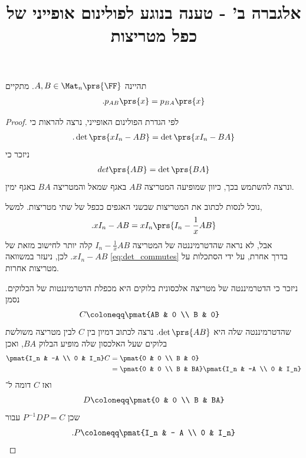 \documentclass[a4paper,10pt,twoside,openany]{article}
\title{
אלגברה ב' - טענה בנוגע לפולינום אופייני של כפל מטריצות
}
\date{}
\begin{document}
\maketitle

\begin{proposition}
תהיינה
$A,B \in \Mat_n\prs{\FF}$.
מתקיים
\begin{align*}
\text{.} p_{AB}\prs{x} = p_{BA}\prs{x}
\end{align*}
\end{proposition}

\begin{proof}
לפי הגדרת הפולינום האופייני, נרצה להראות כי
\begin{align*}
\text{.} \det\prs{x I_n - AB} = \det\prs{xI_n - BA}
\end{align*}
ניזכר כי
\begin{align}\label{eq:det_commutes}
det\prs{AB} = \det\prs{BA}
\end{align}
ונרצה להשתמש בכך, כיוון שמופיעה המטריצה
$AB$
באגף שמאל והמטריצה
$BA$
באגף ימין.

נוכל לנסות לכתוב את המטריצות שבשני האגפים ככפל של שתי מטריצות. למשל,
\begin{align*}
\text{.} x I_n - AB = x I_n \prs{I_n - \frac{1}{x} AB}
\end{align*}
אבל, לא נראה שהדטרמיננטה של המטריצה
$I_n - \frac{1}{x} AB$
קלה יותר לחישוב מזאת של
$x I_n - AB$.
לכן, ניעזר במשוואה
\eqref{eq:det_commutes}
בדרך אחרת, על ידי הסתכלות על מטריצות אחרות.

ניזכר כי הדטרמיננטה של מטריצה אלכסונית בלוקים היא מכפלת הדטרמיננטות של הבלוקים. נסמן
\begin{align*}
C &\coloneqq \pmat{AB & 0 \\ B & 0}
\end{align*}
שהדטרמיננטה שלה היא
$\det\prs{AB}$.
נרצה לכתוב דמיון בין
$C$
לבין מטריצה משולשת בלוקים שעל האלכסון שלה מופיע הבלוק
$BA$,
ואכן
\begin{align*}
\pmat{I_n & -A \\ 0 & I_n} C &= \pmat{0 & 0 \\ B & 0}
\\&= \pmat{0 & 0 \\ B & BA} \pmat{I_n & -A \\ 0 & I_n}
\end{align*}
ואז
$C$
דומה ל־%
\begin{align*}
D \coloneqq \pmat{0 & 0 \\ B & BA}
\end{align*}
שכן
$P^{-1} D P = C$
עבור
\[\text{.} P \coloneqq \pmat{I_n & - A \\ 0 & I_n}\]


\end{proof}
\end{document}
